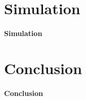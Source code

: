 \documentclass[12pt]{article}
\numberwithin{equation}{section}
\begin{document}
\section{Simulation}
	\paragraph{Simulation}	

\section{Conclusion}
	
	\paragraph{Conclusion}
	
\newpage

\nocite{*}
\printbibliography

\newpage

	
\end{document}
